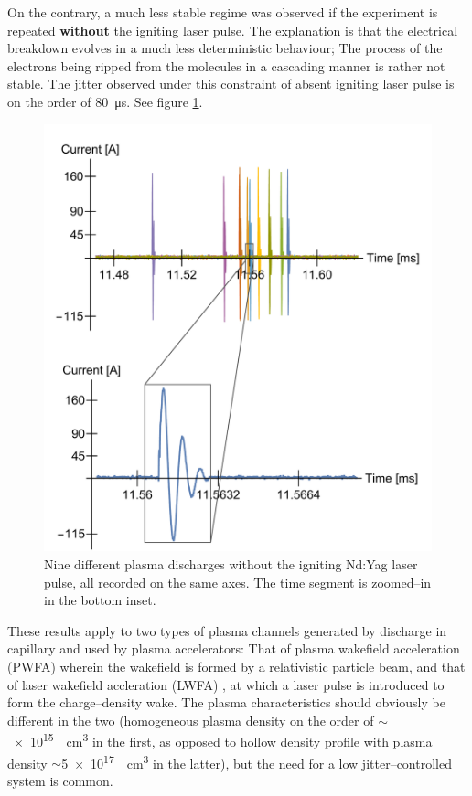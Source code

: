 \documentclass[../main.tex]{subfiles}
\begin{document}
On the contrary, a much less stable regime was observed if the experiment is repeated \textbf{without} the igniting laser pulse. The explanation is that the electrical breakdown evolves in a much less deterministic behaviour; The process of the electrons being ripped from the molecules in a cascading manner is rather not stable. The jitter observed under this constraint of absent igniting laser pulse is on the order of \SI{80}{\us}. See figure \ref{fig:multiple}.
\begin{figure}
    \centering
    \includegraphics[width=\textwidth]{figures/jitter/multiple.pdf}
    \caption{Nine different plasma discharges without the igniting Nd:Yag laser pulse, all recorded on the same axes. The time segment is zoomed--in in the bottom inset.}
    \label{fig:multiple}
\end{figure}

These results apply to two types of plasma channels generated by discharge in capillary and used by plasma accelerators: That of plasma wakefield acceleration (PWFA)\cite{BiagioniGasPulse} wherein the wakefield is formed by a relativistic particle beam, and that of laser wakefield accleration (LWFA) \cite{andBeharEhudLowCapillary}, at which a laser pulse is introduced to form the charge--density wake. The plasma characteristics should obviously be different in the two (homogeneous plasma density on the order of $\sim$\SI{e15}{\per\cubic\cm} in the first, as opposed to hollow density profile with plasma density $\sim$\SI{5e17}{\per\cubic\cm} in the latter), but the need for a low jitter--controlled system is common.
\end{document}
